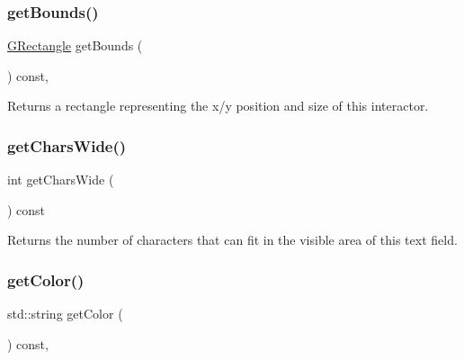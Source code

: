 \mbox{\label{classGInteractor_a29e6ac35a0b48f491a4c88194cc5da3b}} 
\subsubsection{\texorpdfstring{get\+Bounds()}{getBounds()}}
{\footnotesize\ttfamily \mbox{\hyperlink{structGRectangle}{G\+Rectangle}} get\+Bounds (\begin{DoxyParamCaption}{ }\end{DoxyParamCaption}) const\hspace{0.3cm}{\ttfamily [virtual]}, {\ttfamily [inherited]}}



Returns a rectangle representing the x/y position and size of this interactor. 

\mbox{\label{classGTextField_acccdf98a090bca28752d04519a8b1a28}} 
\subsubsection{\texorpdfstring{get\+Chars\+Wide()}{getCharsWide()}}
{\footnotesize\ttfamily int get\+Chars\+Wide (\begin{DoxyParamCaption}{ }\end{DoxyParamCaption}) const\hspace{0.3cm}{\ttfamily [virtual]}}



Returns the number of characters that can fit in the visible area of this text field. 

\mbox{\label{classGInteractor_aa061dfa488c31e18549d64363c1d0e34}} 
\subsubsection{\texorpdfstring{get\+Color()}{getColor()}}
{\footnotesize\ttfamily std\+::string get\+Color (\begin{DoxyParamCaption}{ }\end{DoxyParamCaption}) const\hspace{0.3cm}{\ttfamily [virtual]}, {\ttfamily [inherited]}}



